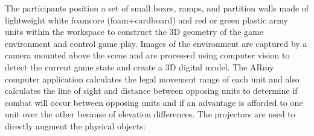 \documentclass[10pt]{article}
\begin{document}

The participants position a set of small boxes, ramps, and partition
walls made of lightweight white foamcore (foam+cardboard) and red or
green plastic army units within the workspace to construct the 3D
geometry of the game environment and control game play.  Images of the
environment are captured by a camera mounted above the scene and are
processed using computer vision to detect the current game state and
create a 3D digital model.  The ARmy computer application calculates
the legal movement range of each unit and also calculates the line of
sight and distance between opposing units to determine if combat will
occur between opposing units and if an advantage is afforded to one
unit over the other because of elevation differences.  The projectors are used to
directly augment the physical objects:
\end{document}
